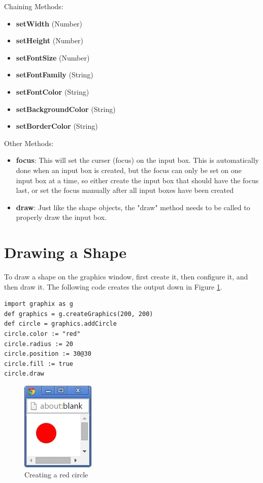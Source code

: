 \documentclass{article}
\begin{document}
Chaining Methods:
\begin{itemize}
\item \textbf{setWidth} (Number)
\item \textbf{setHeight} (Number)
\item \textbf{setFontSize} (Number)
\item \textbf{setFontFamily} (String)
\item \textbf{setFontColor} (String)
\item \textbf{setBackgroundColor} (String)
\item \textbf{setBorderColor} (String)
\end{itemize}

Other Methods:
\begin{itemize}
\item \textbf{focus}: This will set the curser (focus) on the input box. This is automatically done
when an input box is created, but the focus can only be set on one input box at a time, so
either create the input box that should have the focus last, or set the focus manually after all
input boxes have been created
\item \textbf{draw}: Just like the shape objects, the "draw" method needs to be called to properly
draw the input box.
\end{itemize}

\section{Drawing a Shape}
To draw a shape on the graphics window, first create it, then configure it, and then draw it. The following code
creates the output down in Figure \ref{fig:red_circle}.
\begin{lstlisting}
import graphix as g
def graphics = g.createGraphics(200, 200)
def circle = graphics.addCircle
circle.color := "red"
circle.radius := 20
circle.position := 30@30
circle.fill := true
circle.draw
\end{lstlisting}

\begin{figure}[h]
\includegraphics{red_circle}
\centering
\caption{Creating a red circle}
\label{fig:red_circle}
\end{figure}
\end{document}
